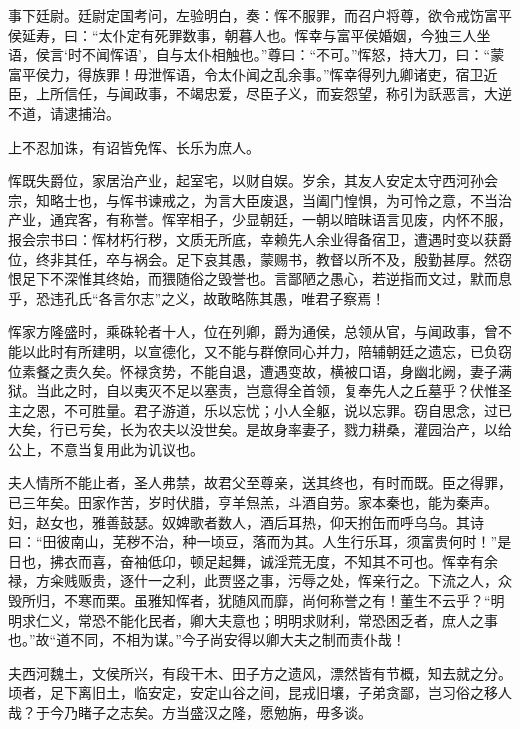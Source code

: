 \documentclass[12pt,UTF8]{ctexbook}
\begin{document}
事下廷尉。廷尉定国考问，左验明白，奏：恽不服罪，而召户将尊，欲令戒饬富平侯延寿，曰：“太仆定有死罪数事，朝暮人也。恽幸与富平侯婚姻，今独三人坐语，侯言‘时不闻恽语’，自与太仆相触也。”尊曰：“不可。”恽怒，持大刀，曰：“蒙富平侯力，得族罪！毋泄恽语，令太仆闻之乱余事。”恽幸得列九卿诸吏，宿卫近臣，上所信任，与闻政事，不竭忠爱，尽臣子义，而妄怨望，称引为訞恶言，大逆不道，请逮捕治。



上不忍加诛，有诏皆免恽、长乐为庶人。



恽既失爵位，家居治产业，起室宅，以财自娱。岁余，其友人安定太守西河孙会宗，知略士也，与恽书谏戒之，为言大臣废退，当阖门惶惧，为可怜之意，不当治产业，通宾客，有称誉。恽宰相子，少显朝廷，一朝以暗昧语言见废，内怀不服，报会宗书曰：恽材朽行秽，文质无所底，幸赖先人余业得备宿卫，遭遇时变以获爵位，终非其任，卒与祸会。足下哀其愚，蒙赐书，教督以所不及，殷勤甚厚。然窃恨足下不深惟其终始，而猥随俗之毁誉也。言鄙陋之愚心，若逆指而文过，默而息乎，恐违孔氏“各言尔志”之义，故敢略陈其愚，唯君子察焉！



恽家方隆盛时，乘硃轮者十人，位在列卿，爵为通侯，总领从官，与闻政事，曾不能以此时有所建明，以宣德化，又不能与群僚同心并力，陪辅朝廷之遗忘，已负窃位素餐之责久矣。怀禄贪势，不能自退，遭遇变故，横被口语，身幽北阙，妻子满狱。当此之时，自以夷灭不足以塞责，岂意得全首领，复奉先人之丘墓乎？伏惟圣主之恩，不可胜量。君子游道，乐以忘忧；小人全躯，说以忘罪。窃自思念，过已大矣，行已亏矣，长为农夫以没世矣。是故身率妻子，戮力耕桑，灌园治产，以给公上，不意当复用此为讥议也。



夫人情所不能止者，圣人弗禁，故君父至尊亲，送其终也，有时而既。臣之得罪，已三年矣。田家作苦，岁时伏腊，亨羊炰羔，斗酒自劳。家本秦也，能为秦声。妇，赵女也，雅善鼓瑟。奴婢歌者数人，酒后耳热，仰天拊缶而呼乌乌。其诗曰：“田彼南山，芜秽不治，种一顷豆，落而为其。人生行乐耳，须富贵何时！”是日也，拂衣而喜，奋袖低卬，顿足起舞，诚淫荒无度，不知其不可也。恽幸有余禄，方籴贱贩贵，逐什一之利，此贾竖之事，污辱之处，恽亲行之。下流之人，众毁所归，不寒而栗。虽雅知恽者，犹随风而靡，尚何称誉之有！董生不云乎？“明明求仁义，常恐不能化民者，卿大夫意也；明明求财利，常恐困乏者，庶人之事也。”故“道不同，不相为谋。”今子尚安得以卿大夫之制而责仆哉！



夫西河魏土，文侯所兴，有段干木、田子方之遗风，漂然皆有节概，知去就之分。顷者，足下离旧土，临安定，安定山谷之间，昆戎旧壤，子弟贪鄙，岂习俗之移人哉？于今乃睹子之志矣。方当盛汉之隆，愿勉旃，毋多谈。
\end{document}
